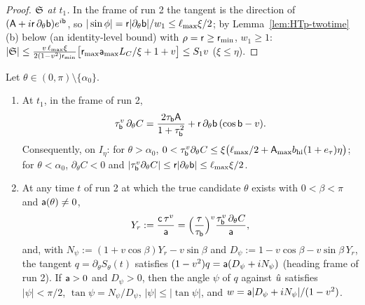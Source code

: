 \begin{proof}
\emph{$\mathfrak S$ at $t_1$.} In the frame of run 2 the tangent is the direction of $(\mathsf A+i\mathsf r\,\partial_\theta\mathsf b)e^{i\mathsf b}$, so
$|\sin\phi|=\mathsf r|\partial_\theta\mathsf b|/w_1\le\ell_{\max}\xi/2$; by Lemma~\ref{lem:HTp-twotime}(b) below (an identity-level bound) with
$\rho=\mathsf r\ge\mathsf r_{\min}$, $w_1\ge1$: $|\mathfrak S|\le\frac{v\,\ell_{\max}\xi}{2(1-v^2)\mathsf r_{\min}}\bigl[\mathsf r_{\max}\mathsf a_{\max}L_C/\xi+1+v\bigr]\le S_1v$
($\xi\le\eta$).
\end{proof}

\begin{lemma}\label{lem:HTp-tilt}
Let $\theta\in(0,\pi)\setminus\{\alpha_0\}$.
\begin{enumerate}
\item[(a)] At $t_1$, in the frame of run 2,
\[
\tau_{\mathsf b}^v\,\partial_\theta C=\frac{2\tau_{\mathsf b}\mathsf A}{1+\tau_{\mathsf b}^2}+\mathsf r\,\partial_\theta\mathsf b\,(\cos\mathsf b-v).
\]
Consequently, on $I_\eta$: for $\theta>\alpha_0$, $0<\tau_{\mathsf b}^v\partial_\theta C\le\xi\bigl(\ell_{\max}/2+\mathsf A_{\max}b_{\mathrm{hi}}(1+e_\tau)\eta\bigr)$;
for $\theta<\alpha_0$, $\partial_\theta C<0$ and $|\tau_{\mathsf b}^v\partial_\theta C|\le\mathsf r|\partial_\theta\mathsf b|\le\ell_{\max}\xi/2$.
\item[(b)] At any time $t$ of run 2 at which the true candidate $\theta$ exists with $0<\beta<\pi$ and $\mathsf a(\theta)\ne0$,
\[
Y_r:=\frac{\mathsf c\,\tau^v}{\mathsf a}=\Bigl(\frac\tau{\tau_{\mathsf b}}\Bigr)^v\frac{\tau_{\mathsf b}^v\,\partial_\theta C}{\mathsf a},
\]
and, with $N_\psi:=(1+v\cos\beta)Y_r-v\sin\beta$ and $D_\psi:=1-v\cos\beta-v\sin\beta\,Y_r$, the tangent
$q=\partial_\theta S_\theta(t)$ satisfies $(1-v^2)q=\mathsf a(D_\psi+iN_\psi)$ (heading frame of run 2). If $\mathsf a>0$ and $D_\psi>0$, then
the angle $\psi$ of $q$ against $\hat u$ satisfies $|\psi|<\pi/2$, $\tan\psi=N_\psi/D_\psi$, $|\psi|\le|\tan\psi|$, and
$w=\mathsf a|D_\psi+iN_\psi|/(1-v^2)$.
\end{enumerate}
\end{lemma}
